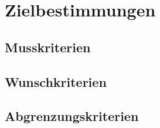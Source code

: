 \section{Zielbestimmungen}



\subsection{Musskriterien}

\begin{itemize}
 
\end{itemize}

\subsection{Wunschkriterien}

\begin{itemize}

\end{itemize}

\subsection{Abgrenzungskriterien}

\begin{itemize}

\end{itemize}
